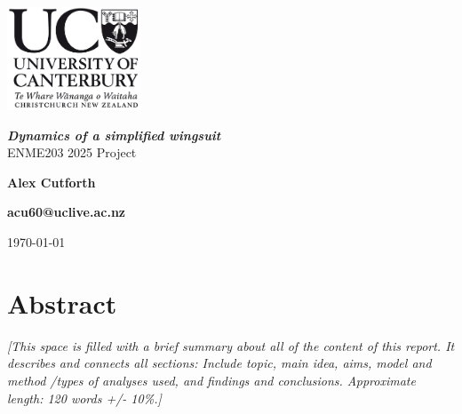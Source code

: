\documentclass[11pt]{article}
\begin{document}
\begin{titlepage}
\hfill\includegraphics[width=40mm]{UCLogo.png}
\begin{center}

\vspace*{\fill}

\textbf{\huge{\textsl{Dynamics of a simplified wingsuit}}}\\
ENME203 2025 Project\\
\vspace*{\fill}


\textbf{\large Alex Cutforth}

\textbf{\large acu60@uclive.ac.nz}

\vspace*{\fill}

\textnormal{\large \today}

\end{center}
\end{titlepage}

\section*{Abstract}
\textcolor[rgb]{0.80,0.29,0.09}{\textsl{[This space is filled with a brief summary about all of the content of this report. It describes and connects all sections: Include topic, main idea, aims, model and method /types of analyses used, and findings and conclusions. Approximate length: 120 words +/- 10\%.]}}


\end{document}
